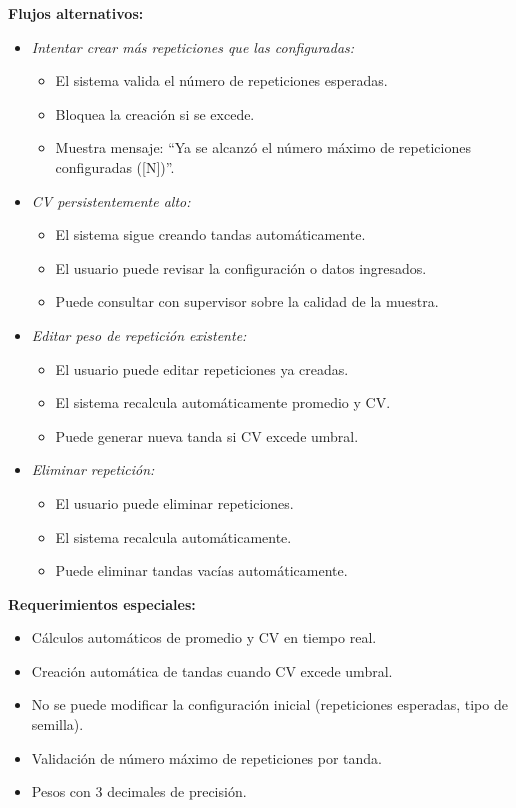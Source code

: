 \vspace{0.5em}
\noindent\textbf{Flujos alternativos:}
\begin{itemize}[nosep]
    \item \textit{Intentar crear más repeticiones que las configuradas:}
    \begin{itemize}[nosep]
        \item El sistema valida el número de repeticiones esperadas.
        \item Bloquea la creación si se excede.
        \item Muestra mensaje: ``Ya se alcanzó el número máximo de repeticiones configuradas ([N])''.
    \end{itemize}
    \item \textit{CV persistentemente alto:}
    \begin{itemize}[nosep]
        \item El sistema sigue creando tandas automáticamente.
        \item El usuario puede revisar la configuración o datos ingresados.
        \item Puede consultar con supervisor sobre la calidad de la muestra.
    \end{itemize}
    \item \textit{Editar peso de repetición existente:}
    \begin{itemize}[nosep]
        \item El usuario puede editar repeticiones ya creadas.
        \item El sistema recalcula automáticamente promedio y CV.
        \item Puede generar nueva tanda si CV excede umbral.
    \end{itemize}
    \item \textit{Eliminar repetición:}
    \begin{itemize}[nosep]
        \item El usuario puede eliminar repeticiones.
        \item El sistema recalcula automáticamente.
        \item Puede eliminar tandas vacías automáticamente.
    \end{itemize}
\end{itemize}

\vspace{0.5em}
\noindent\textbf{Requerimientos especiales:}
\begin{itemize}[nosep]
    \item Cálculos automáticos de promedio y CV en tiempo real.
    \item Creación automática de tandas cuando CV excede umbral.
    \item No se puede modificar la configuración inicial (repeticiones esperadas, tipo de semilla).
    \item Validación de número máximo de repeticiones por tanda.
    \item Pesos con 3 decimales de precisión.
\end{itemize}
